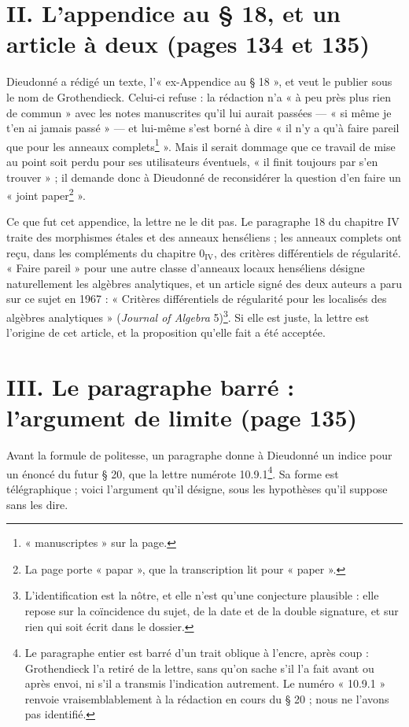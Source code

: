 \documentclass[11pt,a4paper]{article}
\begin{document}
\section*{II. L'appendice au § 18, et un article à deux (pages 134 et 135)}

Dieudonné a rédigé un texte, l'« ex-Appendice au § 18 », et veut le publier
sous le nom de Grothendieck. Celui-ci refuse : la rédaction n'a « à peu près
plus rien de commun » avec les notes manuscrites qu'il lui aurait passées
— « si même je t'en ai jamais passé » — et lui-même s'est borné à dire « il n'y
a qu'à faire pareil que pour les anneaux complets\footnote{« manuscriptes »
sur la page.} ». Mais il serait dommage que ce travail de mise au point soit
perdu pour ses utilisateurs éventuels, « il finit toujours par s'en trouver » ;
il demande donc à Dieudonné de reconsidérer la question d'en faire un « joint
paper\footnote{La page porte « papar », que la transcription lit pour
« paper ».} ».

Ce que fut cet appendice, la lettre ne le dit pas. Le paragraphe 18 du
chapitre IV traite des morphismes étales et des anneaux henséliens ; les
anneaux complets ont reçu, dans les compléments du chapitre $0_{\mathrm{IV}}$,
des critères différentiels de régularité. « Faire pareil » pour une autre
classe d'anneaux locaux henséliens désigne naturellement les algèbres
analytiques, et un article signé des deux auteurs a paru sur ce sujet en
1967 : « Critères différentiels de régularité pour les localisés des algèbres
analytiques » (\emph{Journal of Algebra} 5)\footnote{L'identification est
la nôtre, et elle n'est qu'une conjecture plausible : elle repose sur la
coïncidence du sujet, de la date et de la double signature, et sur rien qui
soit écrit dans le dossier.}. Si elle est juste, la lettre est l'origine de cet
article, et la proposition qu'elle fait a été acceptée.

\section*{III. Le paragraphe barré : l'argument de limite (page 135)}

Avant la formule de politesse, un paragraphe donne à Dieudonné un indice pour
un énoncé du futur § 20, que la lettre numérote 10.9.1\footnote{Le paragraphe
entier est barré d'un trait oblique à l'encre, après coup : Grothendieck l'a
retiré de la lettre, sans qu'on sache s'il l'a fait avant ou après envoi, ni
s'il a transmis l'indication autrement. Le numéro « 10.9.1 » renvoie
vraisemblablement à la rédaction en cours du § 20 ; nous ne l'avons pas
identifié.}. Sa forme est télégraphique ; voici l'argument qu'il désigne, sous
les hypothèses qu'il suppose sans les dire.
\end{document}
